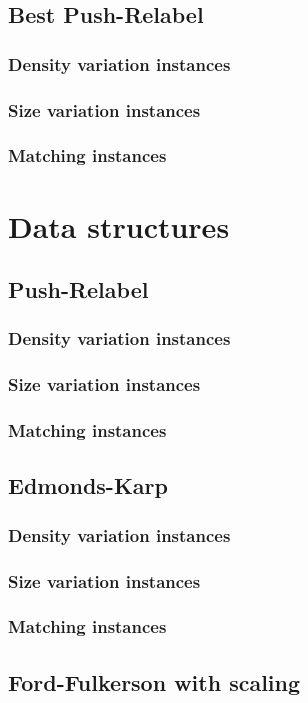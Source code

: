 \subsection{Best Push-Relabel}
\subsubsection{Density variation instances}
\subsubsection{Size variation instances}
\subsubsection{Matching instances}

\section{Data structures}
\subsection{Push-Relabel}
\subsubsection{Density variation instances}
\subsubsection{Size variation instances}
\subsubsection{Matching instances}
\subsection{Edmonds-Karp}
\subsubsection{Density variation instances}
\subsubsection{Size variation instances}
\subsubsection{Matching instances}
\subsection{Ford-Fulkerson with scaling}

